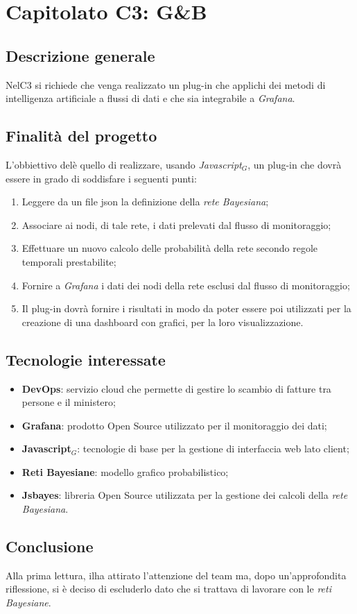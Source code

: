 \chapter{Capitolato C3: G\&B}
\section{Descrizione generale}
NelC3 si richiede che venga realizzato un plug-in che applichi dei metodi di intelligenza artificiale a flussi di dati e che sia integrabile a \emph{Grafana}.
\section{Finalit\`a del progetto}
L'obbiettivo delè quello di realizzare, usando \emph{Javascript$_{G}$}, un plug-in che dovrà essere in grado di soddisfare i seguenti punti:
\begin{enumerate}
	\item Leggere da un file json la definizione della \emph{rete Bayesiana};
	\item Associare ai nodi, di tale rete, i dati prelevati dal flusso di monitoraggio;
	\item Effettuare un nuovo calcolo delle probabilit\`a della rete secondo regole temporali prestabilite;
	\item Fornire a \emph{Grafana} i dati dei nodi della rete esclusi dal flusso di monitoraggio;
	\item Il plug-in dovrà fornire i risultati in modo da poter essere poi utilizzati per la creazione di una dashboard con grafici, per la loro visualizzazione. 
\end{enumerate}
\section{Tecnologie interessate}
\begin{itemize}
	\item \textbf{DevOps}: servizio cloud che permette di gestire lo scambio di fatture tra persone e il ministero;
	\item \textbf{Grafana}: prodotto Open Source utilizzato per il monitoraggio dei dati;
	\item \textbf{Javascript$_{G}$}: tecnologie di base per la gestione di interfaccia web lato client;
	\item \textbf{Reti Bayesiane}: modello grafico probabilistico;
	\item \textbf{Jsbayes}: libreria Open Source utilizzata per la gestione dei calcoli della \emph{rete Bayesiana}.
\end{itemize}
\section{Conclusione}
Alla prima lettura, ilha attirato l'attenzione del team ma, dopo un'approfondita riflessione, si è deciso di escluderlo dato che si trattava di lavorare con le \emph{reti Bayesiane}.